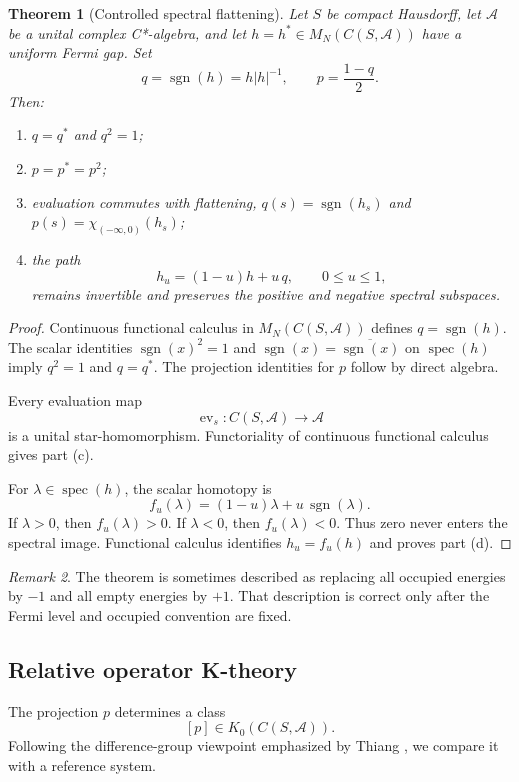 \documentclass[12pt]{article}
\newtheorem{theorem}{Theorem}[section]
\theoremstyle{definition}
\theoremstyle{remark}
\newtheorem{remark}[theorem]{Remark}
\newcommand{\A}{\mathcal A}
\newcommand{\spec}{\operatorname{spec}}
\newcommand{\sgn}{\operatorname{sgn}}
\begin{document}
\begin{theorem}[Controlled spectral flattening]
\label{thm:flattening}
Let $S$ be compact Hausdorff, let $\A$ be a unital complex C*-algebra, and
let $h=h^*\in M_N(C(S,\A))$ have a uniform Fermi gap.
Set
\[
q=\sgn(h)=h|h|^{-1},
\qquad
p=\frac{1-q}{2}.
\]
Then:
\begin{enumerate}[label=(\alph*)]
  \item $q=q^*$ and $q^2=1$;
  \item $p=p^*=p^2$;
  \item evaluation commutes with flattening,
  $q(s)=\sgn(h_s)$ and $p(s)=\chi_{(-\infty,0)}(h_s)$;
  \item the path
  \[
  h_u=(1-u)h+u\,q,
  \qquad 0\leq u\leq1,
  \]
  remains invertible and preserves the positive and negative spectral
  subspaces.
\end{enumerate}
\end{theorem}

\begin{proof}
Continuous functional calculus in $M_N(C(S,\A))$ defines
$q=\sgn(h)$.
The scalar identities
$\sgn(x)^2=1$ and $\sgn(x)=\overline{\sgn(x)}$ on $\spec(h)$ imply
$q^2=1$ and $q=q^*$.
The projection identities for $p$ follow by direct algebra.

Every evaluation map
\[
\operatorname{ev}_s:C(S,\A)\longrightarrow\A
\]
is a unital star-homomorphism.
Functoriality of continuous functional calculus gives part (c).

For $\lambda\in\spec(h)$, the scalar homotopy is
\[
f_u(\lambda)=(1-u)\lambda+u\,\sgn(\lambda).
\]
If $\lambda>0$, then $f_u(\lambda)>0$.
If $\lambda<0$, then $f_u(\lambda)<0$.
Thus zero never enters the spectral image.
Functional calculus identifies $h_u=f_u(h)$ and proves part (d).
\end{proof}

\begin{remark}
The theorem is sometimes described as replacing all occupied energies by
$-1$ and all empty energies by $+1$.
That description is correct only after the Fermi level and occupied
convention are fixed.
\end{remark}

\subsection{Relative operator K-theory}

The projection $p$ determines a class
\[
[p]\in K_0(C(S,\A)).
\]
Following the difference-group viewpoint emphasized by Thiang
\cite{Thiang2016}, we compare it with a reference system.
\end{document}
